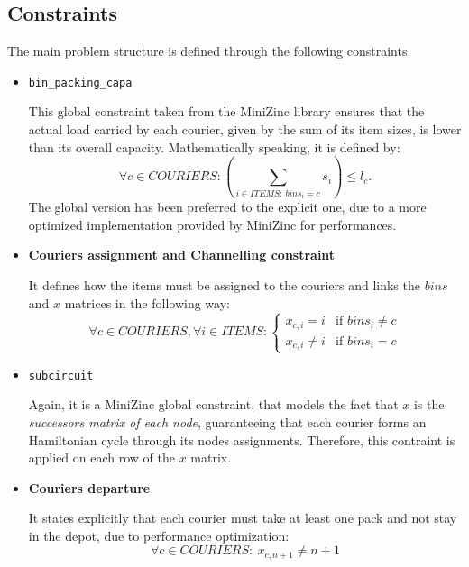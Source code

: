 \subsection{Constraints}
The main problem structure is defined through the following constraints.
\begin{itemize}
    \item \texttt{bin\_packing\_capa}

        This global constraint taken from the MiniZinc library ensures that the actual load carried by each courier, given by the sum of its item sizes, is lower than its overall capacity. Mathematically speaking, it is defined by:
        \begin{equation}
        \forall c \in COURIERS: \left( \sum_{i \in ITEMS:\ bins_i = c} s_i \right) \leq l_c.
        \end{equation}
        The global version has been preferred to the explicit one, due to a more optimized implementation provided by MiniZinc for performances.
    
    \item \textbf{Couriers assignment and Channelling constraint}

        It defines how the items must be assigned to the couriers and links the $bins$ and $x$ matrices in the following way:
        \begin{equation}
            \forall c \in COURIERS,
            \forall i \in ITEMS: 
            \begin{cases}
                x_{c, i} = i    & \text{if $bins_i \neq c$} \\
                x_{c, i} \neq i & \text{if $bins_i = c$} 
            \end{cases}
        \end{equation}
    
    \item \texttt{subcircuit}

        Again, it is a MiniZinc global constraint, that models the fact that $x$ is the \textit{successors matrix of each node}, guaranteeing that each courier forms an Hamiltonian cycle through its nodes assignments. Therefore, this contraint is applied on each row of the $x$ matrix.

    \item \textbf{Couriers departure}

        It states explicitly that each courier must take at least one pack and not stay in the depot, due to performance optimization:
        \begin{equation}
            \forall c \in COURIERS:\ x_{c, n+1} \neq n+1 
        \end{equation}

\end{itemize}

